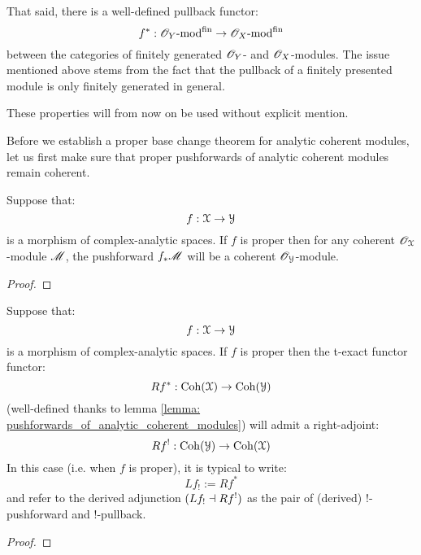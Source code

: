 \begin{remark}
\begin{itemize}
                    That said, there is a well-defined pullback functor:
                        $$f^*: \mathscr{O}_Y\text{-}\mathrm{mod}^{\mathrm{fin}} \to \mathscr{O}_X\text{-}\mathrm{mod}^{\mathrm{fin}}$$
                    between the categories of finitely generated $\mathscr{O}_Y$- and $\mathscr{O}_X$-modules. The issue mentioned above stems from the fact that the pullback of a finitely presented module is only finitely generated in general.
                \end{itemize}
                
                These properties will from now on be used without explicit mention.
            \end{remark}

            Before we establish a proper base change theorem for analytic coherent modules, let us first make sure that proper pushforwards of analytic coherent modules remain coherent. 
            \begin{lemma} \label{lemma: pushforwards_of_analytic_coherent_modules}
                Suppose that:
                    $$f: \mathcal{X} \to \mathcal{Y}$$
                is a morphism of complex-analytic spaces. If $f$ is proper then for any coherent $\mathscr{O}_{\mathcal{X}}$-module $\mathscr{M}$, the pushforward $f_*\mathscr{M}$ will be a coherent $\mathscr{O}_{\mathcal{Y}}$-module. 
            \end{lemma}
                \begin{proof}
                    
                \end{proof}
            \begin{lemma} \label{lemma: derived_!_pushforwards_and_pullbacks_of_analytic_coherent_modules}
                Suppose that:
                    $$f: \mathcal{X} \to \mathcal{Y}$$
                is a morphism of complex-analytic spaces. If $f$ is proper then the t-exact functor functor:
                    $$Rf^*: \mathrm{Coh}(\mathcal{X}) \to \mathrm{Coh}(\mathcal{Y})$$
                (well-defined thanks to lemma \ref{lemma: pushforwards_of_analytic_coherent_modules}) will admit a right-adjoint:
                    $$Rf^!: \mathrm{Coh}(\mathcal{Y}) \to \mathrm{Coh}(\mathcal{X})$$
                In this case (i.e. when $f$ is proper), it is typical to write:
                    $$Lf_! := Rf^*$$
                and refer to the derived adjunction $( Lf_! \dashv Rf^! )$ as the pair of (derived) $!$-pushforward and $!$-pullback.
            \end{lemma}
                \begin{proof}
                    
                \end{proof}
